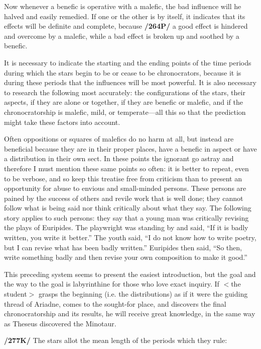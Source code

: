 Now whenever a benefic is operative with a malefic, the bad influence will he halved and easily remedied. If one or the other is by itself, it indicates that its effects will be definite and complete, because \textbf{/264P/} a good effect is hindered and overcome by a malefic, while a bad effect is broken up and soothed by a benefic.

It is necessary to indicate the starting and the ending points of the time periods during which the stars begin to be or cease to be chronocrators, because it is during these periods that the influences will be most
powerful. It is also necessary to research the following most accurately: the configurations of the stars, their aspects, if they are alone or together, if they are benefic or malefic, and if the chronocratorship is malefic, mild, or temperate—all this so that the prediction might take these factors into account. 

Often \mnmb oppositions or squares of malefics do no harm at all, but instead are beneficial because they are in their proper places, have a benefic in aspect or have a distribution in their own sect. In these points the ignorant go astray and therefore I must mention these same points so often: it is better to repeat, even to be verbose, and so keep this treatise free from criticism than to present an opportunity for abuse to envious and small-minded persons. These persons are pained by the success of others and revile work that is well done; they cannot follow what is being said nor think critically about what they say. The following story applies to such persons: they say that a young man was critically
revising the plays of Euripides. The playwright was standing by and said, “If it is badly written, you write it better.” The youth said, “I do not know how to write poetry, but I can revise what has been badly
written.” Euripides then said, “So then, write something badly and then revise your own composition to make it good.” 

This preceding system seems to present the easiest introduction, but the goal and the way to the goal is labyrinthine for those who love exact inquiry. If $<$the student$>$ grasps the beginning (i.e. the
distributions) as if it were the guiding thread of Ariadne, comes to the sought-for place, and discovers the final chronocratorship and its results, he will receive great knowledge, in the same way as Theseus
discovered the Minotaur.

\textbf{/277K/} The stars allot the mean length of the periods which they rule: 

